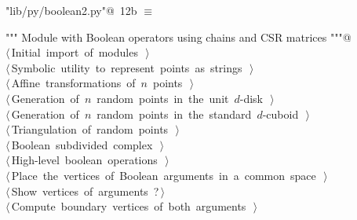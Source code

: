 \documentclass[11pt,oneside]{article}	%
\begin{document}
\begin{flushleft} \small
\begin{minipage}{\linewidth} \label{scrap22}
\protect{}\verb@"lib/py/boolean2.py"@\nobreak\ {\footnotesize 12b }$\equiv$
\vspace{-1ex}
\begin{list}{}{} \item
\mbox{}\verb@""" Module with Boolean operators using chains and CSR matrices """@\\
\mbox{}\verb@@\hbox{$\langle\,$Initial import of modules\nobreak\ {\footnotesize {}}$\,\rangle$}\verb@@\\
\mbox{}\verb@@\hbox{$\langle\,$Symbolic utility to represent points as strings\nobreak\ {\footnotesize {}}$\,\rangle$}\verb@@\\
\mbox{}\verb@@\hbox{$\langle\,$Affine transformations of $n$ points\nobreak\ {\footnotesize {}}$\,\rangle$}\verb@@\\
\mbox{}\verb@@\hbox{$\langle\,$Generation of $n$ random points in the unit $d$-disk\nobreak\ {\footnotesize {}}$\,\rangle$}\verb@@\\
\mbox{}\verb@@\hbox{$\langle\,$Generation of $n$ random points in the standard $d$-cuboid\nobreak\ {\footnotesize {}}$\,\rangle$}\verb@@\\
\mbox{}\verb@@\hbox{$\langle\,$Triangulation of random points\nobreak\ {\footnotesize {}}$\,\rangle$}\verb@@\\
\mbox{}\verb@@\hbox{$\langle\,$Boolean subdivided complex\nobreak\ {\footnotesize {}}$\,\rangle$}\verb@@\\
\mbox{}\verb@@\hbox{$\langle\,$High-level boolean operations\nobreak\ {\footnotesize {}}$\,\rangle$}\verb@@\\
\mbox{}\verb@@\hbox{$\langle\,$Place the vertices of Boolean arguments in a common space\nobreak\ {\footnotesize {}}$\,\rangle$}\verb@@\\
\mbox{}\verb@@\hbox{$\langle\,$Show vertices of arguments\nobreak\ {\footnotesize ?}$\,\rangle$}\verb@@\\
\mbox{}\verb@@\hbox{$\langle\,$Compute boundary vertices of both arguments\nobreak\ {\footnotesize {}}$\,\rangle$}\verb@@\\

\end{list}
\end{minipage}
\end{flushleft}
\end{document}
